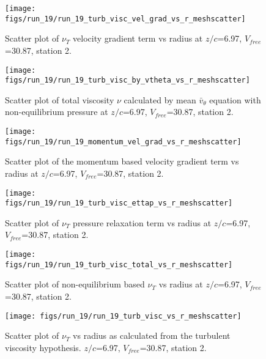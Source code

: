 \begin{figure}[H]
\centering
\texttt{[image: figs/run\_19/run\_19\_turb\_visc\_vel\_grad\_vs\_r\_meshscatter]}
\caption{Scatter plot of $\nu_T$ velocity gradient term vs radius at $z/c$=6.97, $V_{free}$=30.87, station 2.}
\end{figure}


\begin{figure}[H]
\centering
\texttt{[image: figs/run\_19/run\_19\_turb\_visc\_by\_vtheta\_vs\_r\_meshscatter]}
\caption{Scatter plot of total viscosity $\nu$ calculated by mean $\bar{v}_{\theta}$ equation with non-equilibrium pressure at $z/c$=6.97, $V_{free}$=30.87, station 2.}
\end{figure}


\begin{figure}[H]
\centering
\texttt{[image: figs/run\_19/run\_19\_momentum\_vel\_grad\_vs\_r\_meshscatter]}
\caption{Scatter plot of the momentum based velocity gradient term vs radius at $z/c$=6.97, $V_{free}$=30.87, station 2.}
\end{figure}


\begin{figure}[H]
\centering
\texttt{[image: figs/run\_19/run\_19\_turb\_visc\_ettap\_vs\_r\_meshscatter]}
\caption{Scatter plot of $\nu_T$ pressure relaxation term vs radius at $z/c$=6.97, $V_{free}$=30.87, station 2.}
\end{figure}


\begin{figure}[H]
\centering
\texttt{[image: figs/run\_19/run\_19\_turb\_visc\_total\_vs\_r\_meshscatter]}
\caption{Scatter plot of non-equilibrium based $\nu_T$ vs radius at $z/c$=6.97, $V_{free}$=30.87, station 2.}
\end{figure}


\begin{figure}[H]
\centering
\texttt{[image: figs/run\_19/run\_19\_turb\_visc\_vs\_r\_meshscatter]}
\caption{Scatter plot of $\nu_T$ vs radius as calculated from the turbulent viscosity hypothesis. $z/c$=6.97, $V_{free}$=30.87, station 2.}
\end{figure}


